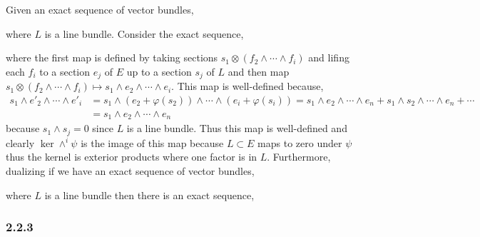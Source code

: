 \documentclass[12pt]{article}
\begin{document}
Given an exact sequence of vector bundles,
\begin{center}
\end{center}
where $L$ is a line bundle. Consider the exact sequence,
\begin{center}
\end{center}
where the first map is defined by taking sections $s_1 \otimes (f_2 \wedge \cdots \wedge f_i)$ and lifing each $f_i$ to a section $e_j$ of $E$ up to a section $s_j$ of $L$ and then map $s_1 \otimes (f_2 \wedge \cdots \wedge f_i) \mapsto s_1 \wedge e_2 \wedge \cdots \wedge e_i$. This map is well-defined because,
\begin{align*}
s_1 \wedge e'_2 \wedge \cdots \wedge e'_{i} & = s_1 \wedge (e_2 + \varphi(s_2)) \wedge \cdots \wedge (e_{i} + \varphi(s_{i})) = s_1 \wedge e_2 \wedge \cdots \wedge e_n + s_1 \wedge s_2 \wedge \cdots \wedge e_n + \cdots 
\\
& = s_1 \wedge e_2 \wedge \cdots \wedge e_n
\end{align*} 
because $s_1 \wedge s_j = 0$ since $L$ is a line bundle. Thus this map is well-defined and clearly $\ker{\wedge^i \psi}$ is the image of this map because $L \subset E$ maps to zero under $\psi$ thus the kernel is exterior products where one factor is in $L$. Furthermore, dualizing if we have an exact sequence of vector bundles,
\begin{center}
\end{center}
where $L$ is a line bundle then there is an exact sequence,
\begin{center}
\end{center}

\subsubsection{2.2.3}
\end{document}
